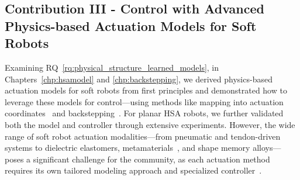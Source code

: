 \subsection{Contribution III - Control with Advanced Physics-based Actuation Models for Soft Robots}
Examining \gls{RQ}~\ref{rq:physical_structure_learned_models}, in Chapters~\ref{chp:hsamodel} and \ref{chp:backstepping}, we derived physics-based actuation models for soft robots from first principles and demonstrated how to leverage these models for control—using methods like mapping into actuation coordinates~\citep{pustina2024input} and backstepping~\citep{khalil2002nonlinear}. For planar \gls{HSA} robots, we further validated both the model and controller through extensive experiments. However, the wide range of soft robot actuation modalities—from pneumatic and tendon-driven systems to dielectric elastomers, metamaterials~\citep{zaidi2021actuation}, and shape memory alloys—poses a significant challenge for the community, as each actuation method requires its own tailored modeling approach and specialized controller~\citep{copaci2020flexible, soleti2024nonlinear, soleti2025model}.

